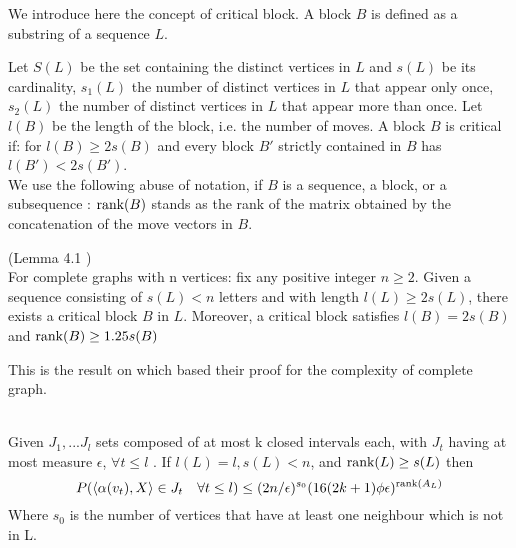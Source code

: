 We introduce here the concept of critical block. A block $B$ is defined as a substring of a sequence $L$.

Let $S(L)$ be the set containing the distinct vertices in $L$ and $s(L)$ be its cardinality, $s_1(L)$ the number of distinct vertices in $L$ that appear only once, $s_2(L)$ the number of distinct vertices in $L$ that appear more than once. Let $l(B)$ be the length of the block, i.e. the number of moves.
A block $B$ is critical if: for $l(B) \geq 2s(B)$ and every block $B'$ strictly contained in $B$ has $l(B') < 2s(B')$.\\
We use the following abuse of notation, if $B$ is a sequence, a block, or a subsequence : $\text{rank}(B)$ stands as the rank of the matrix obtained by the concatenation of the move vectors in $B$.

\begin{lemma}
\label{critical}
(Lemma 4.1 \cite{angel2016local}) \\
For complete graphs with n vertices: fix any positive integer $n \geq 2$. Given a sequence consisting of $s(L) < n$ letters and with length $l(L) \geq 2s(L)$, there exists a critical block $B$ in $L$. Moreover, a critical block satisfies $l(B) = 2s(B)$ and $\text{rank}(B) \geq 1.25s(B)$
\end{lemma} 

This is the result on which \cite{angel2016local} based their proof for the complexity of complete graph.

\begin{lemma} \leavevmode \\
\label{lem::boundN}
Given $J_1, ... J_l$ sets composed of at most k closed intervals each, with $J_t $  having at most measure $\epsilon$, $\forall t \leq l$ .
If $l(L) = l, s(L) < n$, and $\text{rank}(L) \geq s(L)$ then \\
\begin{equation*}
P(\langle \alpha(v_t), X \rangle \in J_t \quad \forall t\leq l)  \leq (2n/\epsilon)^{s_0}(16(2k+1)\phi\epsilon)^{\text{rank}(A_L)}
\end{equation*}
Where $s_0$ is the number of vertices that have at least one neighbour which is not in L. 
\end{lemma}

